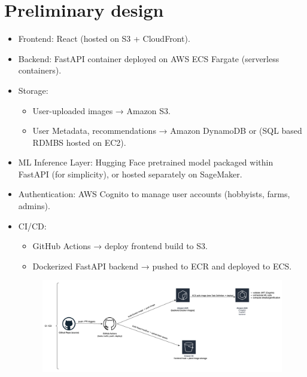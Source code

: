 \documentclass[11pt]{article}
\begin{document}
\section{Preliminary design}

\begin{itemize}
    \item Frontend: React (hosted on S3 + CloudFront).
    \item  Backend: FastAPI container deployed on AWS ECS Fargate (serverless containers).
    \item Storage:
    \begin{itemize}
        \item User-uploaded images → Amazon S3.
        \item User Metadata, recommendations → Amazon DynamoDB or (SQL based RDMBS hosted on EC2).
    \end{itemize}
    \item ML Inference Layer: Hugging Face pretrained model packaged within FastAPI (for simplicity), or hosted separately on SageMaker.
    \item Authentication: AWS Cognito to manage user accounts (hobbyists, farms, admins).
    \item CI/CD: 
    \begin{itemize}
        \item GitHub Actions → deploy frontend build to S3.
        \item Dockerized FastAPI backend → pushed to ECR and deployed to ECS.
    \end{itemize}
\begin{figure}[H]
    \centering
    \includegraphics[width=1\linewidth]{ci_cd_pipeling.png}
    \label{fig:CI/CD Pipeline}
\end{figure}
\begin{figure}[H]
    \centering

\end{figure}
\end{itemize}
\end{document}
